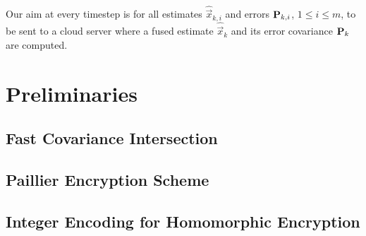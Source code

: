 \documentclass[letterpaper, 10 pt, conference]{ieeeconf}
\begin{document}
Our aim at every timestep is for all estimates $\hat{\vec{x}}_{k,i}$ and errors ${{\mathbf{P}}}_{k,i}$, $1\leq i\leq m$, to be sent to a cloud server where a fused estimate $\hat{\vec{x}}_k$ and its error covariance ${{\mathbf{P}}}_k$ are computed.


% 
%                                                                 
%                                                                 
%                                                                 
% 
\section{Preliminaries}\label{sec:prelims}

\subsection{Fast Covariance Intersection}\label{subsec:fci}

\subsection{Paillier Encryption Scheme}\label{subsec:paillier}

\subsection{Integer Encoding for Homomorphic Encryption}\label{subsec:encoding}


% 
%                                                                        
%                                                                        
%                                                                        
% 
\end{document}
